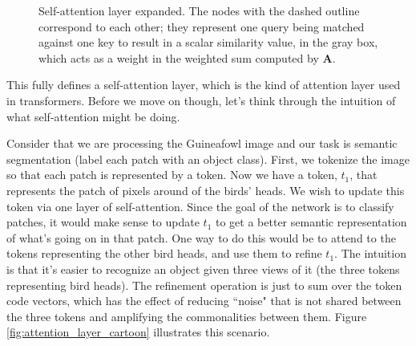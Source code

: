 \begin{figure}[h]
{
}
\caption{Self-attention layer expanded. The nodes with the dashed outline correspond to each other; they represent one query being matched against one key to result in a scalar similarity value, in the gray box, which acts as a weight in the weighted sum computed by $\mathbf{A}$.}
\label{fig:transformers:attn_arch}
\end{figure}

This fully defines a self-attention layer, which is the kind of attention layer used in transformers. Before we move on though, let's think through the intuition of what self-attention might be doing.

Consider that we are processing the Guineafowl image and our task is semantic segmentation (label each patch with an object class). First, we tokenize the image so that each patch is represented by a token. Now we have a token, $t_1$, that represents the patch of pixels around of the birds' heads. We wish to update this token via one layer of self-attention. Since the goal of the network is to classify patches, it would make sense to update $t_1$ to get a better semantic representation of what's going on in that patch. One way to do this would be to attend to the tokens representing the other bird heads, and use them to refine $t_1$. The intuition is that it's easier to recognize an object given three views of it (the three tokens representing bird heads). The refinement operation is just to sum over the token code vectors, which has the effect of reducing ``noise" that is not shared between the three tokens and amplifying the commonalities between them. Figure \ref{fig:attention_layer_cartoon} illustrates this scenario.

